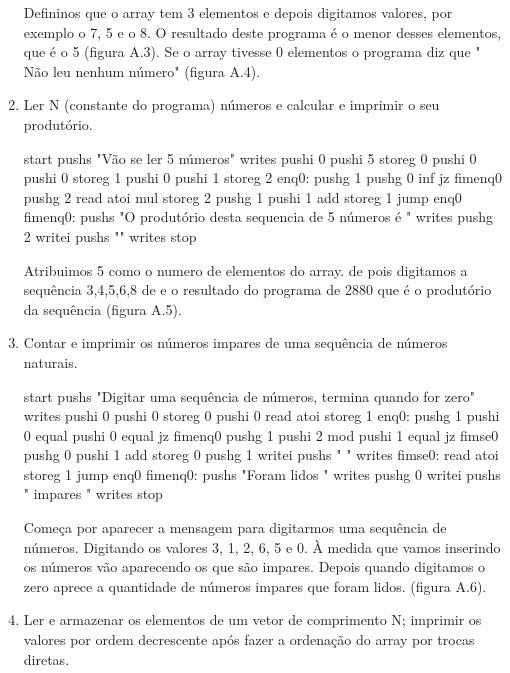 \documentclass{report}
\begin{document}
\begin{enumerate}
	\indent
	Defininos que o array tem 3 elementos e depois digitamos valores, por exemplo o 7, 5 e o 8. O resultado deste programa é o menor desses elementos, que é o 5 (figura A.3). Se o array tivesse 0 elementos o programa diz que " 
	Não leu nenhum número" (figura A.4).
	\item Ler N (constante do programa) números e calcular e imprimir o seu produtório.
	
	\begin{code}
		start
		pushs "Vão se ler 5 números\n"
		writes
		pushi 0
		pushi 5
		storeg 0
		pushi 0
		pushi 0
		storeg 1
		pushi 0
		pushi 1
		storeg 2
		enq0:
		pushg 1
		pushg 0
		inf
		jz fimenq0
		pushg 2
		read
		atoi
		mul
		storeg 2
		pushg 1
		pushi 1
		add
		storeg 1
		jump enq0
		fimenq0:
		pushs "O produtório desta sequencia de 5 números é "
		writes
		pushg 2
		writei
		pushs "\n"
		writes
		stop
		
	\end{code}

	\indent
	Atribuimos 5 como o numero de elementos do array. de pois digitamos a sequência 3,4,5,6,8 de e o resultado do programa de 2880 que é o produtório da sequência (figura A.5).	
	
	\item Contar e imprimir os números impares de uma sequência de números naturais.
	
	\begin{code}
		start
		pushs "Digitar uma sequência de números, termina quando for zero\n"
		writes
		pushi 0
		pushi 0
		storeg 0
		pushi 0
		read
		atoi
		storeg 1
		enq0:
		pushg 1
		pushi 0
		equal
		pushi 0
		equal
		jz fimenq0
		pushg 1
		pushi 2
		mod
		pushi 1
		equal
		jz fimse0
		pushg 0
		pushi 1
		add
		storeg 0
		pushg 1
		writei
		pushs " \n"
		writes
		fimse0:
		read
		atoi
		storeg 1
		jump enq0
		fimenq0:
		pushs "Foram lidos "
		writes
		pushg 0
		writei
		pushs " impares \n"
		writes
		stop
		
	\end{code}
	
	\indent
	Começa por aparecer a mensagem para digitarmos uma sequência de números. 
	Digitando os valores 3, 1, 2, 6, 5 e 0. À medida que vamos inserindo os números vão aparecendo os que são impares. Depois quando digitamos o zero aprece a quantidade de números impares que foram lidos. (figura A.6).
	
	\item Ler e armazenar os elementos de um vetor de comprimento N; imprimir os valores por ordem decrescente após
	fazer a ordenação do array por trocas diretas.
	

\end{enumerate}
\end{document}
